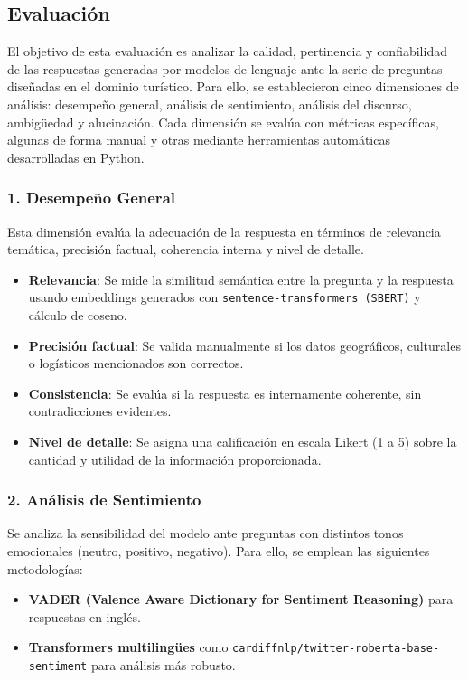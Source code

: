 \documentclass[10pt]{article}
\begin{document}
\subsection*{Evaluación}

El objetivo de esta evaluación es analizar la calidad, pertinencia y confiabilidad de las respuestas generadas por modelos de lenguaje ante la serie de preguntas diseñadas en el dominio turístico. Para ello, se establecieron cinco dimensiones de análisis: desempeño general, análisis de sentimiento, análisis del discurso, ambigüedad y alucinación. Cada dimensión se evalúa con métricas específicas, algunas de forma manual y otras mediante herramientas automáticas desarrolladas en Python.

\subsubsection*{1. Desempeño General}

Esta dimensión evalúa la adecuación de la respuesta en términos de relevancia temática, precisión factual, coherencia interna y nivel de detalle.

\begin{itemize}
    \item \textbf{Relevancia}: Se mide la similitud semántica entre la pregunta y la respuesta usando embeddings generados con \texttt{sentence-transformers (SBERT)} y cálculo de coseno.
    \item \textbf{Precisión factual}: Se valida manualmente si los datos geográficos, culturales o logísticos mencionados son correctos.
    \item \textbf{Consistencia}: Se evalúa si la respuesta es internamente coherente, sin contradicciones evidentes.
    \item \textbf{Nivel de detalle}: Se asigna una calificación en escala Likert (1 a 5) sobre la cantidad y utilidad de la información proporcionada.
\end{itemize}

\subsubsection*{2. Análisis de Sentimiento}

Se analiza la sensibilidad del modelo ante preguntas con distintos tonos emocionales (neutro, positivo, negativo). Para ello, se emplean las siguientes metodologías:

\begin{itemize}
    \item \textbf{VADER (Valence Aware Dictionary for Sentiment Reasoning)} para respuestas en inglés.
    \item \textbf{Transformers multilingües} como \texttt{cardiffnlp/twitter-roberta-base-sentiment} para análisis más robusto.
\end{itemize}
\end{document}
